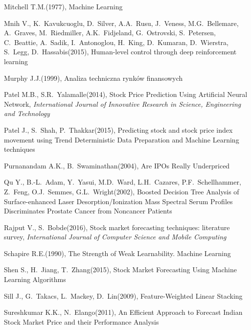 \documentclass[12pt,a4paper,twoside,openany]{book}
\begin{document}
\begin{thebibliography}{99}
 Mitchell T.M.(1977), Machine Learning

 Mnih V., K.~Kavukcuoglu, D.~Silver, A.A.~Rusu, J.~Veness, M.G.~Bellemare, A.~Graves, M.~Riedmiller, A.K.~Fidjeland, G.~Ostrovski, S.~Petersen, C.~Beattie, A.~Sadik, I.~Antonoglou, H.~King, D.~Kumaran, D.~Wierstra, S.~Legg, D.~Hassabis(2015), Human-level control through deep reinforcement learning

 Murphy J.J.(1999), Analiza techniczna rynków finansowych

 Patel M.B., S.R.~Yalamalle(2014), Stock Price Prediction Using Artificial Neural Network, \textit{International Journal of Innovative Research in Science, Engineering and Technology}

 Patel J., S.~Shah, P.~Thakkar(2015), Predicting stock and stock price index movement using Trend Deterministic Data Preparation and Machine Learning techniques

 Purnanandam A.K., B.~Swaminathan(2004), Are IPOs Really Underpriced

 Qu Y., B.-L.~Adam, Y.~Yasui, M.D.~Ward, L.H.~Cazares, P.F.~Schellhammer, Z.~Feng, O.J.~Semmes, G.L.~Wright(2002), Boosted Decision Tree Analysis of Surface-enhanced Laser Desorption/Ionization Mass Spectral Serum Profiles Discriminates Prostate Cancer from Noncancer Patients

 Rajput V., S.~Bobde(2016), Stock market forecasting techniques: literature survey, \textit{International Journal of Computer Science and Mobile Computing}

 Schapire R.E.(1990), The Strength of Weak Learnability. Machine Learning

 Shen S., H.~Jiang, T.~Zhang(2015), Stock Market Forecasting Using Machine Learning Algorithms

 Sill J., G.~Takacs, L.~Mackey, D.~Lin(2009), Feature-Weighted Linear Stacking

 Sureshkumar K.K., N.~Elango(2011), An Efficient Approach to Forecast Indian Stock Market Price and their Performance Analysis


\end{thebibliography}
\end{document}
